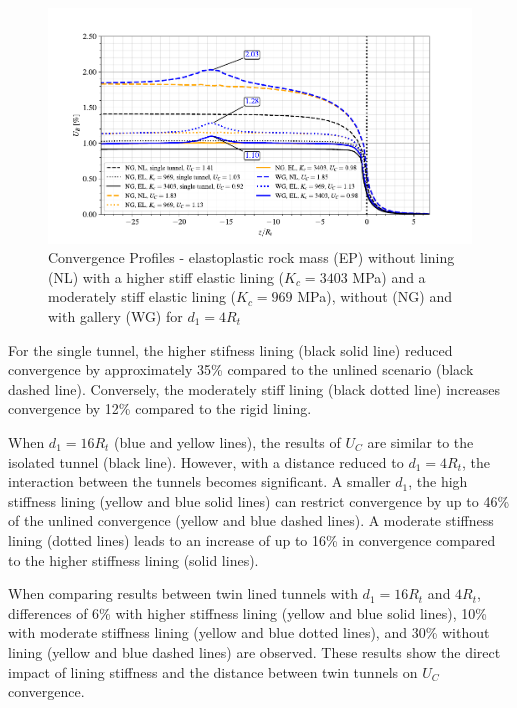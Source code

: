 \documentclass[a4paper,fleqn]{cas-sc}
\begin{document}
\begin{figure}[h!]
	\centering
	\includegraphics[scale=0.9]{Convergence Profiles - EP_d1_4Ri_anotate.pdf}
	\caption{Convergence Profiles - elastoplastic rock mass (EP) without lining (NL) with a higher stiff elastic lining ($K_c = 3403$ MPa) and a moderately stiff elastic lining ($K_c = 969$ MPa), without (NG) and with gallery (WG) for $d_1 = 4R_t$}
	\label{EP_d1_4Ri}
\end{figure}
\FloatBarrier

For the single tunnel, the higher stifness lining (black solid line) reduced convergence by approximately 35\% compared to the unlined scenario (black dashed line). Conversely, the moderately stiff lining (black dotted line) increases convergence by 12\% compared to the rigid lining. 

When $d_1 = 16R_t$ (blue and yellow lines), the results of $U_{C}$ are similar to the isolated tunnel (black line). However, with a distance reduced to $d_1 = 4R_t$, the interaction between the tunnels becomes significant. A smaller $d_1$, the high stiffness lining (yellow and blue solid lines) can restrict convergence by up to 46\% of the unlined convergence (yellow and blue dashed lines). A moderate stiffness lining (dotted lines) leads to an increase of up to 16\% in convergence compared to the higher stiffness lining (solid lines).

When comparing results between twin lined tunnels with $d_1 = 16R_t$ and $4R_t$, differences of 6\% with higher stiffness lining (yellow and blue solid lines), 10\% with moderate stiffness lining (yellow and blue dotted lines), and 30\% without lining (yellow and blue dashed lines) are observed. These results show the direct impact of lining stiffness and the distance between twin tunnels on $U_{C}$ convergence.
\end{document}
